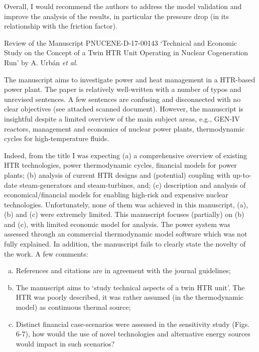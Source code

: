 \documentclass[14pt,twoside]{report}
\begin{document}
Overall, I would recommend the authors to address the model validation and improve the analysis of the results, in particular the pressure drop (in its relationship with the friction factor). 





\clearpage





\begin{center}
  {\Large Review of the Manuscript PNUCENE-D-17-00143 `Technical and Economic Study on the Concept of a Twin HTR Unit Operating in Nuclear Cogeneration Run' by A. Urb\'an {\it et al.}}
\end{center}

\medskip
The manuscript aims to investigate power and heat management in a HTR-based power plant. The paper is relatively well-written with a number of typos and unrevised sentences. A few sentences are confusing and disconnected with no clear objectives (see attached scanned document).  However, the manuscript is insightful despite a limited overview of the main subject areas, e.g., GEN-IV reactors, management and economics of nuclear power plants, thermodynamic cycles for high-temperature fluids.

Indeed, from the title I was expecting (a) a comprehensive overview of existing HTR technologies, power thermodynamic cycles, financial models for power plants; (b) analysis of current HTR designs and (potential) coupling with up-to-date steam-generators and steam-turbines, and; (c) description and analysis of economical/financial models for enabling high-risk and expensive nuclear technologies. Unfortunately, none of them was achieved in this manuscript, (a), (b) and (c) were extremely limited. This manuscript focuses (partially) on (b) and (c), with limited economic model for analysis. The power system was assessed through an commercial thermodynamic model software which was not fully explained. In addition, the manuscript fails to clearly state the novelty of the work. A few comments:
\begin{enumerate}[(a)] 
%
    \item References and citations are in agreement with the journal guidelines;
    \item The manuscript aims to `study technical aspects of a twin HTR unit'. The HTR was poorly described, it was rather assumed (in the thermodynamic model) as continuous thermal source;
    \item Distinct financial case-scenarios were assessed in the sensitivity study (Figs. 6-7), how would the use of novel technologies and alternative energy sources would impact in such scenarios?
\end{enumerate}
\end{document}
